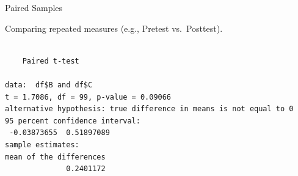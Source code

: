 \begin{frame}[fragile]{Paired Samples}

\center
Comparing repeated measures (e.g., Pretest vs.~Posttest).

\begin{Shaded}
\begin{Highlighting}[]
\OperatorTok{$}\OperatorTok{$} \NormalTok{)}
\end{Highlighting}
\end{Shaded}

\begin{verbatim}

    Paired t-test

data:  df$B and df$C
t = 1.7086, df = 99, p-value = 0.09066
alternative hypothesis: true difference in means is not equal to 0
95 percent confidence interval:
 -0.03873655  0.51897089
sample estimates:
mean of the differences 
              0.2401172 
\end{verbatim}

\end{frame}

